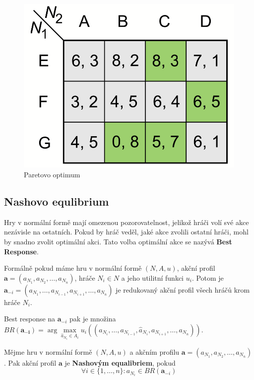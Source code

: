 \documentclass{article}
\begin{document}
\begin{figure}[h]
\begin{center}
\includegraphics[scale=0.6]{Paret}
\caption{Paretovo optimum}
\label{fig:paret}
\end{center}
\end{figure}

\subsection*{Nashovo equlibrium}

Hry v normální formě mají omezenou pozorovatelnost, jelikož hráči volí své akce nezávisle na ostatních. Pokud by hráč veděl, jaké akce zvolili ostatní hráči, mohl by snadno zvolit optimální akci. Tato volba optimální akce se nazývá \textbf{Best Response}.\par

Formálně pokud máme hru v normální formě $(N, A, u)$, akční profil $\boldsymbol{a}=(a_{N_1}, a_{N_2}, \dots, a_{N_n})$, hráče $N_i \in N$ a jeho utilitní funkci $u_i$. Potom je $\boldsymbol{a}_{-i}=(a_{N_1}, \dots,a_{N_{i-1}}, a_{N_{i+1}}, \dots, a_{N_n})$ je redukovaný akční profil všech hráčů krom hráče $N_i$.\par 

Best response na $\boldsymbol{a}_{-i}$ pak je množina $BR(\boldsymbol{a_{-i}}) = \arg \max\limits_{\hat{a}_{N_i} \in A_i} u_i((a_{N_i}, \dots, a_{N_{i-1}}, \hat{a}_{N_i}, a_{N_{i+1}}, \dots, a_{N_n}))$.\par 

Mějme hru v normální formě $(N, A, u)$ a akčním profilu $\boldsymbol{a} = (a_{N_1}, a_{N_2}, \dots, a_{N_n})$. Pak akční profil $\boldsymbol{a}$ je \textbf{Nashovým equalibriem}, pokud $$\forall i \in \{1, \dots, n\}: a_{N_i} \in BR(\boldsymbol{a}_{-i})$$
\end{document}
